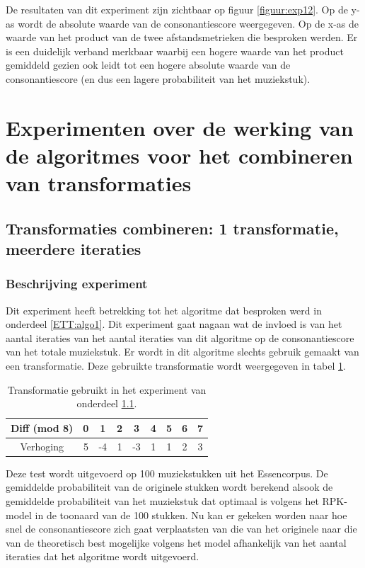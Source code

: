 De resultaten van dit experiment zijn zichtbaar op figuur \ref{figuur:exp12}. Op de y-as wordt de absolute waarde van de consonantiescore weergegeven. Op de x-as de waarde van het product van de twee afstandsmetrieken die besproken werden. Er is een duidelijk verband merkbaar waarbij een hogere waarde van het product gemiddeld gezien ook leidt tot een hogere absolute waarde van de consonantiescore (en dus een lagere probabiliteit van het muziekstuk).

\section{Experimenten over de werking van de algoritmes voor het combineren van transformaties}
\subsection{Transformaties combineren: 1 transformatie, meerdere iteraties}
\label{experiment:1}
\subsubsection{Beschrijving experiment}
Dit experiment heeft betrekking tot het algoritme dat besproken werd in onderdeel \ref{ETT:algo1}. Dit experiment gaat nagaan wat de invloed is van het aantal iteraties van het aantal iteraties van dit algoritme op de consonantiescore van het totale muziekstuk. Er wordt in dit algoritme slechts gebruik gemaakt van een transformatie. Deze gebruikte transformatie wordt weergegeven in tabel \ref{tabel:exp1}.

\begin{table}
  \centering
  \begin{tabular}{c | c c c c c c c c }
    Diff (mod 8) & 0 & 1 & 2 & 3 & 4 & 5 & 6 & 7 \\
    \hline
    \hline
    Verhoging & 5 & -4 & 1 & -3 & 1 & 1 & 2 & 3 \\
  \end{tabular}
  \caption{Transformatie gebruikt in het experiment van onderdeel \ref{experiment:1}.}
  \label{tabel:exp1}
\end{table}

Deze test wordt uitgevoerd op 100 muziekstukken uit het Essencorpus. De gemiddelde probabiliteit van de originele stukken wordt berekend alsook de gemiddelde probabiliteit van het muziekstuk dat optimaal is volgens het RPK-model in de toonaard van de 100 stukken. Nu kan er gekeken worden naar hoe snel de consonantiescore zich gaat verplaatsten van die van het originele naar die van de theoretisch best mogelijke volgens het model afhankelijk van het aantal iteraties dat het algoritme wordt uitgevoerd.

